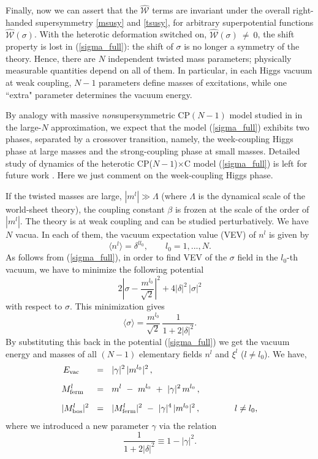 \documentclass[12pt]{article}
\def\beq{\begin{equation}}
\def\eeq{\end{equation}}
\newcommand{\mc}[1]{\mathcal{#1}}
\newcommand{\CPC}{CP($N-1$)$\times$C }
\begin{document}
	Finally, now we can assert that the $ \hat{\mc{W}} $ terms are invariant under the overall
	right-handed supersymmetry \eqref{msusy} and \eqref{tsusy}, for  arbitrary 
	superpotential functions $ \hat{\mc{W}}(\sigma) $.
	With the heterotic deformation switched on, $ \hat{\mc{W}}(\sigma) ~\neq~ 0 $,
the shift property is lost in (\ref{sigma_full}):
the shift of $ \sigma $ is no longer a symmetry of the theory. Hence,
there are $ N $ independent twisted mass parameters; physically measurable
quantities depend on
 all of them. 
	In particular, in each Higgs vacuum at weak coupling, $ N - 1 $ parameters define masses of excitations, while one ``extra" parameter determines
	the vacuum energy.



By analogy with massive {\em non}supersymmetric CP$(N-1)$ model
studied in \cite{GSYphtr} in the large-$N$ approximation, we expect
that the model (\ref{sigma_full}) exhibits  two phases, 
separated by a crossover transition,
namely, the week-coupling Higgs phase at large masses and 
the strong-coupling phase at small masses. Detailed study of dynamics
of the heterotic \CPC model (\ref{sigma_full}) is left for future work
\cite{BSY5}. Here we just comment on the week-coupling Higgs phase.

If the twisted masses are large, $|m^l|\gg \Lambda$ (where $\Lambda$ is
the dynamical  scale of the world-sheet theory), the coupling constant
$\beta$ is frozen at the scale of the order of $|m^l|$.
The theory is at weak coupling   and can be studied
perturbatively. We have $N$ vacua. In   each of them,  the vacuum expectation value (VEV) of
$n^l$ is given by
\beq
\langle n^l \rangle =\delta^{ll_0}, \qquad l_0=1,...,N.
\label{higgsn}
\eeq
As follows from (\ref{sigma_full}), in order to find VEV of  the $\sigma$ 
field in the $l_0$-th vacuum, we have to minimize the following potential
\beq
2\left|\sigma -\frac{m^{l_0}}{\sqrt{2}}\right|^2 
+4|\delta|^2\,|\sigma|^2
\label{sigmapot}
\eeq
with respect to $\sigma$.
This minimization gives
\beq
\langle \sigma \rangle = \frac{m^{l_0}}{\sqrt{2}}\,
\frac{1}{1+2|\delta|^2}.
\label{higgssigma}
\eeq
By substituting this back in the potential (\ref{sigma_full})
we get the vacuum energy and masses of all $(N-1)$
elementary fields $n^l$ and $\xi^l$ ($l\neq l_0$). We have,
\begin{align}
%
\notag
	E_\text{vac}~~\;\, & ~~=~~ |\gamma|^2\, |m^{l_0}|^2 \,,
	\\[2mm]
%
\label{hetmass}
	M_\text{ferm}^l\;\,\, & ~~=~~ m^l ~-~ m^{l_0} ~+~ |\gamma|^2\,m^{l_0} \,,
	\\[2mm]
%
\notag
	| M_\text{bos}^l |^2 & ~~=~~ | M_\text{ferm}^l |^2 ~-~ |\gamma|^4\, |m^{l_0}|^2\,,
	\qquad\qquad
	l\neq l_0,
\end{align}
where we introduced a new parameter $\gamma$ via the relation
\beq
\frac{1}{1+2|\delta|^2}\equiv 1-|\gamma|^2.
\label{gammadelta}
\eeq
\end{document}
